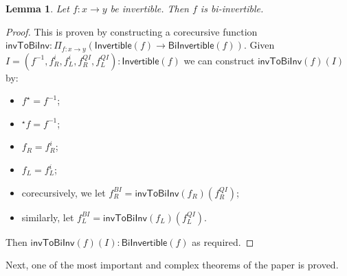 \documentclass[draft]{article}
\newtheorem{lemma}[theorem]{Lemma} \theoremstyle{definition}
\newcommand{\linv}[1]{{}^\star\!#1} \newcommand{\rinv}[1]{#1^\star}
\newcommand{\inv}[1]{#1^{-1}} \newcommand{\comp}{\star}
\begin{document}
\begin{lemma}\label{inv-to-bi-inv}
  Let \(f : x \to y\) be invertible. Then \(f\) is bi-invertible.
\end{lemma}

\begin{proof}
  This is proven by constructing a corecursive function
  \(\mathsf{invToBiInv} : \Pi_{f : x \to y} (\mathsf{Invertible}(f)
  \to \mathsf{BiInvertible}(f))\). Given \(I = (\inv
  f,f_R^i,f_L^i,f_R^{QI}, f_L^{QI}) : \mathsf{Invertible}(f)\) we can
  construct \(\mathsf{invToBiInv}(f)(I)\) by:
  \begin{itemize}
  \item \(\rinv f = \inv f\);
  \item \(\linv f = \inv f\);
  \item \(f_R = f_R^i\);
  \item \(f_L = f_L^i\);
  \item corecursively, we let \(f_R^{BI} =
    \mathsf{invToBiInv}(f_R)(f_R^{QI})\);
  \item similarly, let \(f_L^{BI} =
    \mathsf{invToBiInv}(f_L)(f_L^{QI})\).
  \end{itemize}
  Then \(\mathsf{invToBiInv}(f)(I) : \mathsf{BiInvertible}(f)\) as
  required.
\end{proof}

\noindent Next, one of the most important and complex theorems of the
paper is proved.
\end{document}
